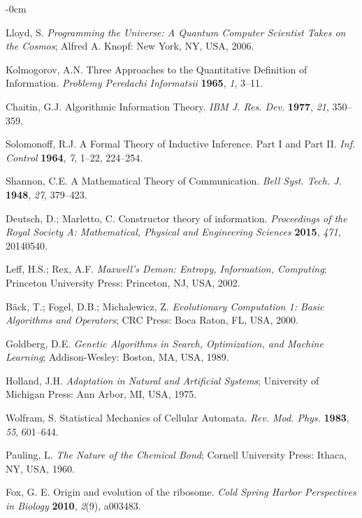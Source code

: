 \documentclass[entropy,article,submit,pdftex,moreauthors]{Definitions/mdpi}
\begin{document}
\begin{adjustwidth}{-\extralength}{0cm}
\begin{thebibliography}{999}
Lloyd, S. \textit{Programming the Universe: A Quantum Computer Scientist Takes on the Cosmos}; Alfred A. Knopf: New York, NY, USA, 2006.

Kolmogorov, A.N. Three Approaches to the Quantitative Definition of Information. \textit{Problemy Peredachi Informatsii} \textbf{1965}, \textit{1}, 3–11.

Chaitin, G.J. Algorithmic Information Theory. \textit{IBM J. Res. Dev.} \textbf{1977}, \textit{21}, 350–359. 

Solomonoff, R.J. A Formal Theory of Inductive Inference. Part I and Part II. \textit{Inf. Control} \textbf{1964}, \textit{7}, 1–22, 224–254.

Shannon, C.E. A Mathematical Theory of Communication. \textit{Bell Syst. Tech. J.} \textbf{1948}, \textit{27}, 379–423.

Deutsch, D.; Marletto, C. Constructor theory of information. \textit{Proceedings of the Royal Society A: Mathematical, Physical and Engineering Sciences} \textbf{2015}, \textit{471}, 20140540. 

Leff, H.S.; Rex, A.F. \textit{Maxwell’s Demon: Entropy, Information, Computing}; Princeton University Press: Princeton, NJ, USA, 2002.

Bäck, T.; Fogel, D.B.; Michalewicz, Z. \textit{Evolutionary Computation 1: Basic Algorithms and Operators}; CRC Press: Boca Raton, FL, USA, 2000.

Goldberg, D.E. \textit{Genetic Algorithms in Search, Optimization, and Machine Learning}; Addison-Wesley: Boston, MA, USA, 1989.

Holland, J.H. \textit{Adaptation in Natural and Artificial Systems}; University of Michigan Press: Ann Arbor, MI, USA, 1975.

Wolfram, S. Statistical Mechanics of Cellular Automata. \textit{Rev. Mod. Phys.} \textbf{1983}, \textit{55}, 601–644.

Pauling, L. \textit{The Nature of the Chemical Bond}; Cornell University Press: Ithaca, NY, USA, 1960.

Fox, G. E. 
Origin and evolution of the ribosome. 
\textit{Cold Spring Harbor Perspectives in Biology} \textbf{2010}, \textit{2}(9), a003483.


\end{thebibliography}
\end{adjustwidth}
\end{document}
